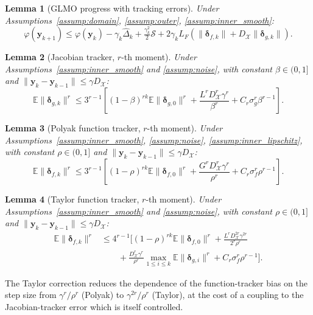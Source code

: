 \documentclass{article}
\newcommand{\cX}{\mathcal{X}}
\def\vy{{\bm{y}}}
\newcommand{\E}{\mathbb{E}}
\newtheorem{lemma}{Lemma}
\begin{document}
\begin{lemma}[GLMO progress with tracking errors] \label{lem:glmo_main}
Under Assumptions~\ref{assump:domain}, \ref{assump:outer}, \ref{assump:inner_smooth}:
\[
\varphi(\vy_{k+1}) \le \varphi(\vy_k) - \gamma_k \hat\Delta_k + \tfrac{\gamma_k^2}{2} \mathcal{S} + 2 \gamma_k L_F (\|\bm{\delta}_{f,k}\| + D_{\cX} \|\bm{\delta}_{g,k}\|).
\]
\end{lemma}

\begin{lemma}[Jacobian tracker, $r$-th moment] \label{lem:grad_tracker_main}
Under Assumptions~\ref{assump:inner_smooth} and \ref{assump:noise}, with constant $\beta \in (0,1]$ and $\|\vy_k - \vy_{k-1}\| \le \gamma D_{\cX}$:
\[
\E\|\bm{\delta}_{g,k}\|^r \le 3^{r-1}\!\left[(1-\beta)^{rk} \E\|\bm{\delta}_{g,0}\|^r + \frac{L^r D_{\cX}^r \gamma^r}{\beta^r} + C_r \sigma_g^r \beta^{r-1}\right].
\]
\end{lemma}

\begin{lemma}[Polyak function tracker, $r$-th moment] \label{lem:func_polyak_main}
Under Assumptions~\ref{assump:inner_smooth}, \ref{assump:noise}, \ref{assump:inner_lipschitz}, with constant $\rho \in (0,1]$ and $\|\vy_k - \vy_{k-1}\| \le \gamma D_{\cX}$:
\[
\E\|\bm{\delta}_{f,k}\|^r \le 3^{r-1}\!\left[(1-\rho)^{rk} \E\|\bm{\delta}_{f,0}\|^r + \frac{G^r D_{\cX}^r \gamma^r}{\rho^r} + C_r \sigma_f^r \rho^{r-1}\right].
\]
\end{lemma}

\begin{lemma}[Taylor function tracker, $r$-th moment] \label{lem:func_taylor_main}
Under Assumptions~\ref{assump:inner_smooth} and \ref{assump:noise}, with constant $\rho \in (0,1]$ and $\|\vy_k - \vy_{k-1}\| \le \gamma D_{\cX}$:
\begin{align*}
\E\|\bm{\delta}_{f,k}\|^r &\le 4^{r-1}\!\Big[(1-\rho)^{rk} \E\|\bm{\delta}_{f,0}\|^r + \frac{L^r D_{\cX}^{2r} \gamma^{2r}}{2^r \rho^r} \\
&\qquad + \frac{D_{\cX}^r \gamma^r}{\rho^r} \max_{1 \le i \le k} \E\|\bm{\delta}_{g,i}\|^r + C_r \sigma_f^r \rho^{r-1}\Big].
\end{align*}
\end{lemma}

The Taylor correction reduces the dependence of the function-tracker bias on the step size from $\gamma^r/\rho^r$ (Polyak) to $\gamma^{2r}/\rho^r$ (Taylor), at the cost of a coupling to the Jacobian-tracker error which is itself controlled.
\end{document}
